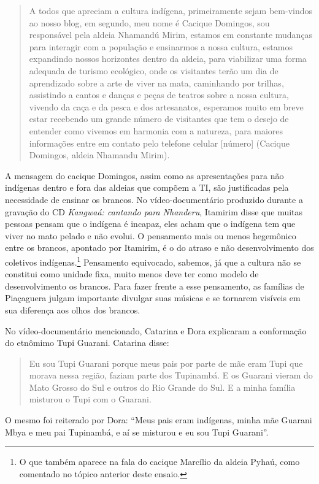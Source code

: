 \begin{quotation}
A todos que apreciam a cultura indígena, primeiramente sejam bem-vindos ao
nosso blog, em segundo, meu nome é Cacique Domingos, sou responsável
pela aldeia Nhamandú Mirim, estamos em constante mudanças para
interagir com a população e ensinarmos a nossa cultura, estamos
expandindo nossos horizontes dentro da aldeia, para viabilizar uma
forma adequada de turismo ecológico, onde os visitantes terão um dia de
aprendizado sobre a arte de viver na mata, caminhando por trilhas,
assistindo a cantos e danças e peças de teatros sobre a nossa cultura,
vivendo da caça e da pesca e dos artesanatos, esperamos muito em breve
estar recebendo um grande número de visitantes que tem o desejo de
entender como vivemos em harmonia com a natureza, para maiores
informações entre em contato pelo telefone celular [número] (Cacique
Domingos, aldeia Nhamandu Mirim).
\end{quotation}

A mensagem do cacique Domingos, assim como as apresentações para não
indígenas dentro e fora das aldeias que compõem a TI, são justificadas
pela necessidade de ensinar os brancos. No vídeo-documentário produzido
durante a gravação do CD \emph{Kangwaá: cantando para Nhanderu}, Itamirim
disse que muitas pessoas pensam que o indígena é incapaz, eles acham
que o indígena tem que viver no mato pelado e não evolui. O pensamento
mais ou menos hegemônico entre os brancos, apontado por Itamirim, é o
do atraso e não desenvolvimento dos coletivos indígenas.\footnote{O que
também aparece na fala do cacique Marcílio da aldeia Pyhaú, como
comentado no tópico anterior deste ensaio.} Pensamento equivocado,
sabemos, já que a cultura não se constitui como unidade fixa, muito
menos deve ter como modelo de desenvolvimento os brancos. Para fazer
frente a esse pensamento, as famílias de Piaçaguera julgam importante
divulgar suas músicas e se tornarem visíveis em sua diferença aos olhos
dos brancos.

No vídeo-documentário mencionado, Catarina e Dora explicaram a
conformação do etnômimo Tupi Guarani. Catarina disse: 

\begin{quotation}
Eu sou Tupi Guarani porque meus pais por parte de mãe eram Tupi que
morava nessa região, faziam parte dos Tupinambá. E os Guarani vieram do
Mato Grosso do Sul e outros do Rio Grande do Sul. E a minha família
misturou o Tupi com o Guarani.
\end{quotation}

O mesmo foi reiterado por Dora: ``Meus pais eram indígenas, minha mãe
Guarani Mbya e meu pai Tupinambá, e aí se misturou e eu sou Tupi
Guarani''.

